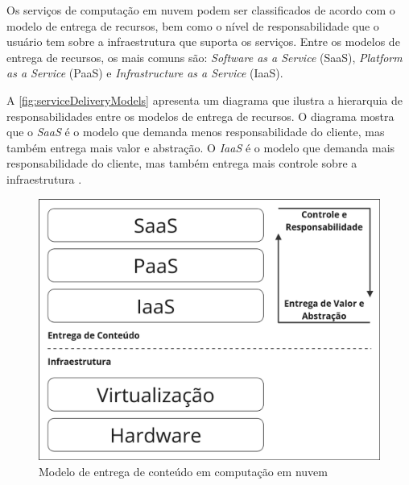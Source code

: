 Os serviços de computação em nuvem podem ser classificados de acordo com o modelo de entrega de recursos, bem como o nível de responsabilidade que o usuário tem sobre a infraestrutura que suporta os serviços. Entre os modelos de entrega de recursos, os mais comuns são: \textit{Software as a Service} (SaaS), \textit{Platform as a Service} (PaaS) e \textit{Infrastructure as a Service} (IaaS). \citep{cloudcomputingcambridge}

A \autoref{fig:serviceDeliveryModels} apresenta um diagrama que ilustra a hierarquia de responsabilidades entre os modelos de entrega de recursos. O diagrama mostra que o \textit{SaaS} é o modelo que demanda menos responsabilidade do cliente, mas também entrega mais valor e abstração. O \textit{IaaS} é o modelo que demanda mais responsabilidade do cliente, mas também entrega mais controle sobre a infraestrutura \citep{cloudcomputingcambridge}.

\begin{figure}[H]
\captionsetup{width=.7\textwidth}%
\caption{Modelo de entrega de conteúdo em computação em nuvem}
\label{fig:serviceDeliveryModels}
\includegraphics[width=.7\textwidth]{capitulos/1-revisao-da-literatura/files/deliovery-model.png}
\end{figure}

